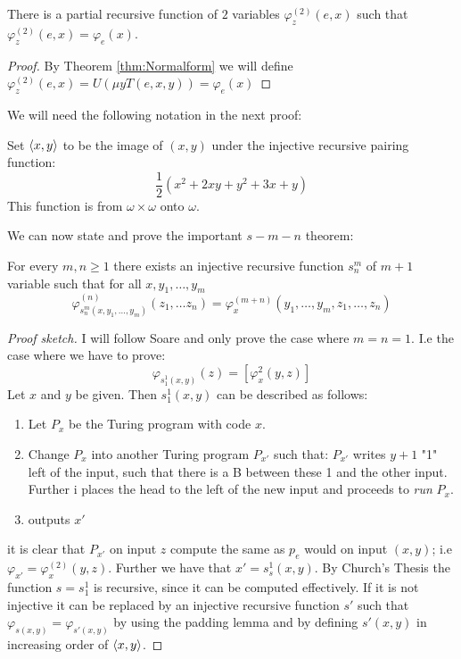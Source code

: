 \documentclass[../main.tex]{subfiles}
\begin{document}
\begin{thm}
	\label{thm:Emu}
	There is a partial recursive function of $2$ variables
	$\varphi_z^{(2)}(e,x)$ such that $\varphi_z^{(2)}(e,x)=\varphi_e(x)$.
\end{thm}
\begin{proof}
	By Theorem \ref{thm:Normalform} we will define
	$\varphi_z^{(2)}(e,x)=U(\mu y T(e,x,y))=\varphi_e(x)$
\end{proof}
We will need the following notation in the next proof:
\begin{defi}
	Set $\langle x,y\rangle$ to be the image of $(x,y)$ under the injective
	recursive  pairing function:
	$$\frac{1}{2}(x^2+2xy+y^2+3x+y)$$
	This function is from $\omega\times\omega$ onto $\omega$.
\end{defi}
We can now state and prove the important $s-m-n$ theorem:
\begin{thm}[$s-m-n$ Theorem]
	For every $m,n\geq 1$ there exists an injective recursive function
	$s_n^m$ of $m+1$ variable such that for all $x,y_1,\ldots,y_m$
	\[\varphi^{(n)}_{s^m_n(x,y_1,\ldots,y_m)}(z_1,\ldots z_n)=
	\varphi^{(m+n)}_x(y_1,\ldots,y_m,z_1,\ldots,z_n)\]
\end{thm}
\begin{proof}[Proof sketch]
	I will follow Soare and only prove the case where $m=n=1$. I.e the case
	where we have to prove:
	\[\varphi_{s^1_1(x,y)}(z)=[\varphi_x^{2}(y,z)]\]
	Let $x$ and $y$ be given. Then $s^1_1(x,y)$ can be described as
	follows:
	\begin{enumerate}
		\item Let $P_x$ be the Turing program with code $x$.
		\item Change $P_x$ into another Turing program $P_{x'}$ such
			that: $P_{x'}$ writes $y+1$ "1" left of the input, such
			that there is a B between these 1 and the other input.
			Further i places the head to the left of the new input
			and proceeds to \textit{run} $P_x$.
		\item outputs $x'$
	\end{enumerate}
	it is clear that $P_{x'}$ on input $z$ compute the same as $p_e$ would
	on input $(x,y)$; i.e $\varphi_{x'}=\varphi_x^{(2)}(y,z)$. Further we
	have that $x'=s^1_s(x,y)$.
	By Church's Thesis the function $s=s^1_1$ is recursive, since it can be
	computed effectively. If it is not injective it can be replaced by an
	injective recursive function $s'$ such that
	$\varphi_{s(x,y)}=\varphi_{s'(x,y)}$ by using the padding lemma and by
	defining $s'(x,y)$ in increasing order of $\langle x,y\rangle$.
\end{proof}
\end{document}
